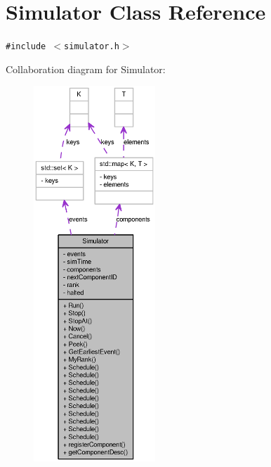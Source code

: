 \section{Simulator Class Reference}
\label{classSimulator}
{\tt \#include $<$simulator.h$>$}

Collaboration diagram for Simulator:\nopagebreak
\begin{figure}[H]
\begin{center}
\leavevmode
\includegraphics[height=400pt]{classSimulator__coll__graph}
\end{center}
\end{figure}
